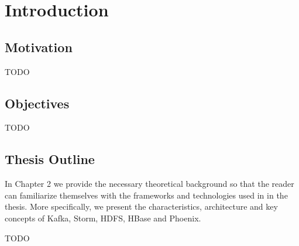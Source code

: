 \chapter{Introduction}

\section{Motivation}

TODO\cite{geolite}


\section{Objectives}

TODO


\section{Thesis Outline}

In Chapter 2 we provide the necessary theoretical background so that the reader can familiarize themselves with the frameworks and technologies used in in the thesis. More specifically, we present the characteristics, architecture and key concepts of Kafka, Storm, HDFS, HBase and Phoenix.

TODO

\cleardoublepage
